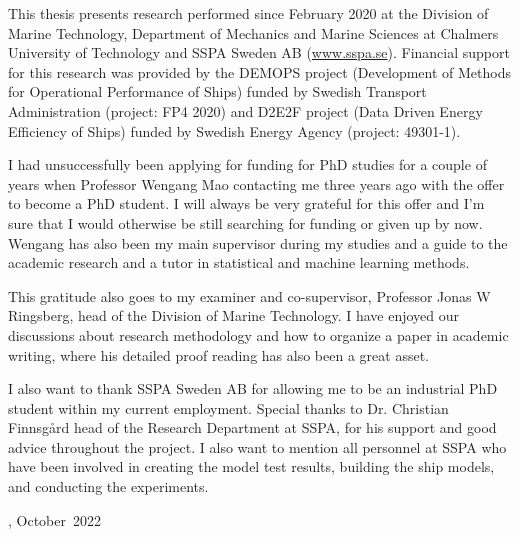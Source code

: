 This thesis presents research performed since February 2020 at the Division of Marine Technology, Department of Mechanics and Marine Sciences at Chalmers University of Technology and SSPA Sweden AB (\href{www.sspa.se}{www.sspa.se}). Financial support for this research was provided by the DEMOPS project (Development of Methods for Operational Performance of Ships) funded by Swedish Transport Administration (project: FP4 2020) and D2E2F project (Data Driven Energy Efficiency of Ships) funded by Swedish Energy Agency (project: 49301-1).

I had unsuccessfully been applying for funding for PhD studies for a couple of years when Professor Wengang Mao contacting me three years ago with the offer to become a PhD student. I will always be very grateful for this offer and I'm sure that I would otherwise be still searching for funding or given up by now. Wengang has also been my main supervisor during my studies and a guide to the academic research and a tutor in statistical and machine learning methods.  

This gratitude also goes to my examiner and co-supervisor, Professor Jonas W Ringsberg,
head of the Division of Marine Technology. I have enjoyed our discussions about research methodology and how to organize a paper in academic writing, where his detailed proof reading has also been a great asset.

I also want to thank SSPA Sweden AB for allowing me to be an industrial PhD student within my current employment. Special thanks to Dr. Christian Finnsgård head of the Research Department at SSPA, for his support and good advice throughout the project. I also want to mention all personnel at SSPA who have been involved in creating the model test results, building the ship models, and conducting the experiments.

\vskip 2pc

\noindent \thesisauthor

\noindent \thesiscity, October\  2022  %
